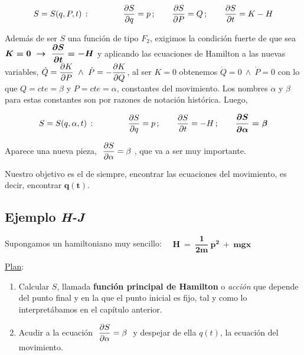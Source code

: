 \begin{equation}
\label{T27StoF}
S=S(q,P,t)\, : \qquad \qquad\pdv{S}{q}=p \, ; \qquad  \pdv{S}{P}=Q\, ; \qquad \pdv{S}{t}=K-H	
\end{equation}

Además de ser $S$ una función de tipo $F_2$, exigimos la condición fuerte de que  sea $\boldsymbol{K=0 \ \to \ \displaystyle \pdv{S}{t}=-H}$ y aplicando las ecuaciones de Hamilton a las nuevas variables, $\displaystyle \dot Q=\pdv{K}{P} \ \wedge \ \dot P=-\pdv{K}{Q}$, al ser $K=0$ obtenemos $\dot Q=0 \ \wedge \ \dot P=0$ con lo que $Q=cte=\beta$ y $P=cte=\alpha$, constantes del movimiento. \textcolor{gris}{Los nombres $\alpha$ y $\beta$ para estas constantes son por razones de notación histórica}. Luego,

\begin{equation}
\label{T27Sqalphat}	
S=S(q,\alpha,t)\, : \qquad \qquad \pdv{S}{q}=p\, ; \qquad \pdv{S}{t}=-H\, ; \qquad \boldsymbol{\pdv{S}{\alpha}=\beta}
\end{equation}

Aparece una nueva pieza, $\ \displaystyle \pdv{S}{\alpha}=\beta \ $, que va a ser muy importante.


Nuestro objetivo es el de siempre, encontrar las ecuaciones del movimiento, es decir, encontrar $\boldsymbol{q(t)}$.

\vspace{10mm}
\subsection{Ejemplo \emph{H-J}}
\vspace{5mm}


\begin{example}

Supongamos un hamiltoniano muy sencillo: $\quad \boldsymbol{ H\ = \ \dfrac 1{2m} \ p^2 \ + \ mgx } $	
\end{example}

\underline{Plan}:

\begin{enumerate}
\item Calcular $S$, llamada \textbf{función principal de Hamilton} o \emph{acción} que depende del punto final y en la que el punto inicial es fijo, tal y como lo interpretábamos en el capítulo anterior.
\item Acudir a la ecuación 	$\ \displaystyle \pdv{S}{\alpha}=\beta \ $  y despejar de ella $q(t)$, la ecuación del movimiento.
\end{enumerate}


